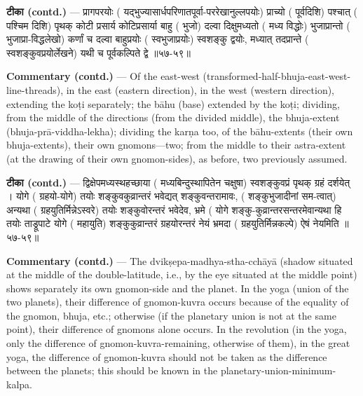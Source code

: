 \documentclass[11pt,a4paper]{article}
\newcommand{\skt}[1]{{\devanagarifont\color{sktcolor} #1}}
\newenvironment{bilingual}{%
  \par\noindent
  \begin{minipage}[t]{0.47\textwidth}%
}{%
  \par\end{minipage}%
}
\newcommand{\rightcol}{%
  \par\end{minipage}%
  \hfill
  \begin{minipage}[t]{0.47\textwidth}%
}
\begin{document}
\begin{bilingual}
\textbf{टीका (contd.)} --- \skt{प्रागपरयोः} (\skt{यद्भुज्यासार्धपरिणातपूर्वा-पररेखानुल्लपयोः}) \skt{प्राच्यो} (\skt{पूर्वदिशि}) \skt{पश्चात्} (\skt{पश्चिम दिशि}) \skt{पृथक् कोटी प्रसार्य कोटिप्रसार्या बाहु} (\skt{भुजो}) \skt{दल्वा दिक्षुमध्यतो} (\skt{मध्य विद्धोः}) \skt{भुजाप्रान्तो} (\skt{भुजाप्रा-विद्धलेखो}) \skt{कर्णां च दल्वा बाहुप्रयोः} (\skt{स्वभुजाप्रयोः}) \skt{स्वशङ्कु} द्वयोः, \skt{मध्यात् तदप्रान्ते} (\skt{स्वशङ्कुवप्रयोर्लेखने}) \skt{यथी च पूर्वकल्पिते द्वे} ॥५७-५९॥
\rightcol
\textbf{Commentary (contd.)} --- Of the east-west (transformed-half-bhuja-east-west-line-threads), in the east (eastern direction), in the west (western direction), extending the koṭi separately; the bāhu (base) extended by the koṭi; dividing, from the middle of the directions (from the divided middle), the bhuja-extent (bhuja-prā-viddha-lekha); dividing the karṇa too, of the bāhu-extents (their own bhuja-extents), their own gnomons---two; from the middle to their astra-extent (at the drawing of their own gnomon-sides), as before, two previously assumed.
\end{bilingual}

\medskip

\begin{bilingual}
\textbf{टीका (contd.)} --- \skt{द्विक्षेपमध्यस्थहच्छाया} (\skt{मध्यबिन्दुस्थापितेन चक्षुषा}) \skt{स्वशङ्कुवप्रं पृथक् ग्रहं दर्शयेत् । योगे} (\skt{ग्रहयो-योगे}) \skt{तयोः शङ्कुवकुव्रान्तरं भवेद्यत् शङ्कुवन्तरामावः,} (\skt{शङ्कुभुजादीनां सम-त्वात्}) \skt{अन्यथा} (\skt{ग्रहयुतिर्मिन्नेऽस्वरे}) \skt{तयोः शङ्कुवोरन्तरं भवेदेव, भ्रमे} (\skt{योगे शङ्कु-कुव्रान्तरसन्तरमेवान्यथा हि तयोः} ताड्रूपाटे \skt{योगे} (\skt{महायुति}) \skt{शङ्कुकुव्रान्तरं ग्रहयोरन्तरं नेयं भ्रमदा} (\skt{ग्रहयुतिर्मिन्नकल्पे}) \skt{ऐषं नेयमिति} ॥५७-५९॥
\rightcol
\textbf{Commentary (contd.)} --- The dvikṣepa-madhya-stha-cchāyā (shadow situated at the middle of the double-latitude, i.e., by the eye situated at the middle point) shows separately its own gnomon-side and the planet. In the yoga (union of the two planets), their difference of gnomon-kuvra occurs because of the equality of the gnomon, bhuja, etc.; otherwise (if the planetary union is not at the same point), their difference of gnomons alone occurs. In the revolution (in the yoga, only the difference of gnomon-kuvra-remaining, otherwise of them), in the great yoga, the difference of gnomon-kuvra should not be taken as the difference between the planets; this should be known in the planetary-union-minimum-kalpa.
\end{bilingual}
\end{document}
